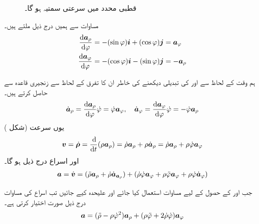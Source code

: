 \begin{figure}
\begin{minipage}{0.45\textwidth}
\caption
{قطبی محدد میں سرعتی سمتیہ  ہو گا۔}
\label{شکل_سمتی_تفاعل_سمتی_رفتار_سمتیہ}
\end{minipage}
\end{figure}

مساوات  سے ہمیں   درج ذیل ملتے ہیں۔
\begin{gather}
\begin{aligned}\label{مساوات_سمتی_تفاعل_قطبی_روپ_ب}
\frac{\dif\arho}{\dif \varphi}&=-(\sin\varphi)\ai+(\cos\varphi)\aj=\avarphi\\
\frac{\dif\avarphi}{\dif\varphi}&=-(\cos\varphi)\ai-(\sin\varphi)\aj=-\arho
\end{aligned}
\end{gather}

ہم  وقت کے لحاظ سے  اور  کی تبدیلی دیکھنے کی خاطر ان  کا  تفرق  کے لحاظ سے زنجیری قاعدہ  سے حاصل کرتے   ہیں۔
\begin{gather}
\begin{aligned}\label{مساوات_سمتی_تفاعل_قطبی_روپ_پ}
\dot{\kvec{a}}_{\rho}=\frac{\dif\arho}{\dif\varphi}\dot{\varphi}=\dot{\varphi}\avarphi,\quad\dot{\kvec{a}}_{\varphi}=\frac{\dif\avarphi}{\dif\varphi}\dot{\varphi}=-\dot{\varphi}\arho
\end{aligned}
\end{gather}
یوں سرعت (شکل )
\begin{align}\label{مساوات_سمتی_تفاعل_قطبی_روپ_ت}
\kvec{v}=\dot{\kvec{\rho}}=\frac{\dif}{\dif t}(\rho\arho)=\dot{\rho}\arho+\rho\dot{\kvec{a}}_{\rho}=\dot{\rho}\arho+\rho\dot{\varphi}\avarphi
\end{align}
اور اسراع  درج  ذیل ہو گا۔
\begin{align}\label{مساوات_سمتی_تفاعل_قطبی_روپ_ٹ}
{\ensuremath{{\boldsymbol{a}}}}=\dot{{{\boldsymbol{v}}}}=(\ddot{\rho}{\boldsymbol{a}}_{\rho}+\dot{\rho}\dot{{{\boldsymbol{a}}}}_{{\boldsymbol{a}}_{\rho}})+(\dot{\rho}\dot{\varphi}{\boldsymbol{a}}_{\varphi}+\rho\ddot{\varphi}{\boldsymbol{a}}_{\varphi}+\rho\dot{\varphi}\dot{{{\boldsymbol{a}}}}_{\varphi})
\end{align}

جب  اور  کے حصول کے لیے   مساوات  استعمال کیا جائے اور    علیحدہ کیے جائیں  تب اسراع کی مساوات   درج ذیل  صورت اختیار کرتی ہے۔
\begin{align}\label{مساوات_سمتی_تفاعل_قطبی_روپ_ث}
{\ensuremath{{\boldsymbol{a}}}}=(\ddot{\rho}-\rho\dot{\varphi}^2){\boldsymbol{a}}_{\rho}+(\rho\ddot{\varphi}+2\dot{\rho}\dot{\varphi}){\boldsymbol{a}}_{\varphi}
\end{align} 

